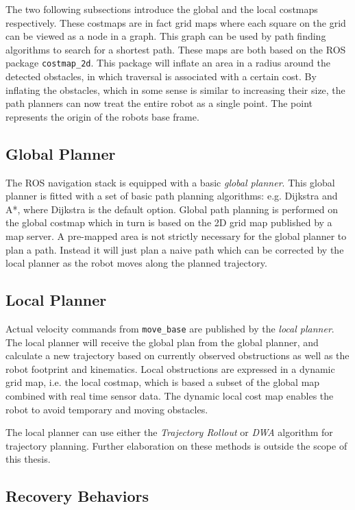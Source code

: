 The two following subsections introduce the global and the local costmaps respectively. These costmaps are in fact grid maps where each square on the grid can be viewed as a node in a graph. This graph can be used by path finding algorithms to search for a shortest path. These maps are both based on the \ac{ROS} package \texttt{costmap\_2d}. This package will inflate an area in a radius around the detected obstacles, in which traversal is associated with a certain cost. By inflating the obstacles, which in some sense is similar to increasing their size, the path planners can now treat the entire robot as a single point. The point represents the origin of the robots base frame.

\subsection{Global Planner}

The \ac{ROS} navigation stack is equipped with a basic \textit{global planner}. This global planner is fitted with a set of basic path planning algorithms: e.g. Dijkstra and A*, where Dijkstra is the default option. Global path planning is performed on the global costmap which in turn is based on the 2D grid map published by a map server. A pre-mapped area is not strictly necessary for the global planner to plan a path. Instead it will just plan a naive path which can be corrected by the local planner as the robot moves along the planned trajectory.

\subsection{Local Planner}

Actual velocity commands from \texttt{move\_base} are published by the \textit{local planner}. The local planner will receive the global plan from the global planner, and calculate a new trajectory based on currently observed obstructions as well as the robot footprint and kinematics. Local obstructions are expressed in a dynamic grid map, i.e. the local costmap, which is based a subset of the global map combined with real time sensor data. The dynamic local cost map enables the robot to avoid temporary and moving obstacles.

The local planner can use either the \textit{Trajectory Rollout} or \textit{\ac{DWA}} algorithm for trajectory planning. Further elaboration on these methods is outside the scope of this thesis.

\subsection{Recovery Behaviors}

